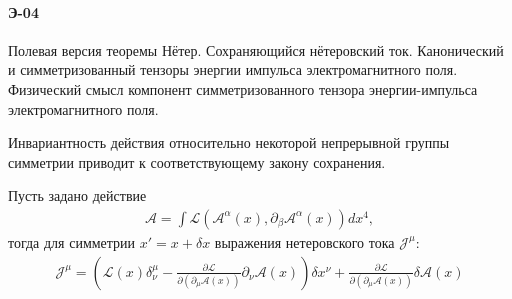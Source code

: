 \documentclass[__main__.tex]{subfiles}
\begin{document}
\paragraph{Э-04}
Полевая версия теоремы Нётер. Сохраняющийся нётеровский ток. Канонический и симметризованный тензоры энергии импульса электромагнитного поля. Физический смысл компонент симметризованного тензора энергии-импульса электромагнитного поля.\\

\begin{theorem}[Нётер]
    Инвариантность действия относительно некоторой непрерывной группы симметрии приводит к соответствующему закону сохранения.
\end{theorem}

Пусть задано действие
\begin{gather}
    \mathcal{A}=\int\mathcal{L}\left( \mathcal{A}^\alpha (x),\partial_\beta \mathcal{A}^\alpha(x)\right)dx^4,
\end{gather}
тогда для симметрии $x\prime=x+\delta x$ выражения нетеровского тока $\mathcal{J}^\mu$:
\begin{gather}
\mathcal{J}^\mu
=
\left(\mathcal{L}(x)\delta_\nu^\mu-\frac{\partial \mathcal{L}}{\partial (\partial_\mu\mathcal{A}(x))}\partial_\nu\mathcal{A}(x)\right)\delta x^\nu+\frac{\partial\mathcal{L}}{\partial(\partial_\mu\mathcal{A}(x))}\delta\mathcal{A}(x)
\end{gather}
\end{document}
